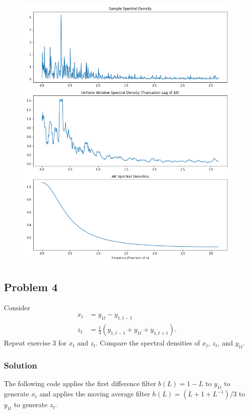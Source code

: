 \documentclass[oneside, a4paper]{amsart}
\begin{document}
\begin{figure}[!h]
\includegraphics[width=\textwidth]{q3-fig}
\caption{}
\label{q3-fig}
\end{figure}


\subsection*{Problem 4}

Consider
\begin{align*}
	x_t &= y_{1t} - y_{1,t-1} \\ %
	z_t &= \frac{1}{3}(y_{1,t-1} + y_{1t} + y_{1,t+1}). %
\end{align*}
Repeat exercise 3 for $x_t$ and $z_t$. Compare the spectral densities of $x_t$, $z_t$, and $y_{1t}$. 


\subsubsection*{Solution}

The following code applies the first difference filter $b(L) = 1-L$ to $y_{1t}$ to generate $x_t$ and applies the moving average filter $h(L)=(L + 1 + L^{-1})/3$ to $y_{1t}$ to generate $z_t$.
\end{document}
